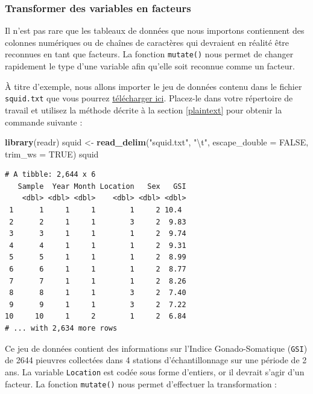 \documentclass[
  a4paper,
]{article}
\newenvironment{Shaded}{\begin{snugshade}}{\end{snugshade}}
\newcommand{\CharTok}[1]{\textcolor[rgb]{0.57,0.30,0.62}{#1}}
\newcommand{\DataTypeTok}[1]{\textcolor[rgb]{0.00,0.34,0.68}{#1}}
\newcommand{\KeywordTok}[1]{\textcolor[rgb]{0.12,0.11,0.11}{\textbf{#1}}}
\newcommand{\NormalTok}[1]{\textcolor[rgb]{0.12,0.11,0.11}{#1}}
\newcommand{\OtherTok}[1]{\textcolor[rgb]{0.00,0.43,0.16}{#1}}
\newcommand{\StringTok}[1]{\textcolor[rgb]{0.75,0.01,0.01}{#1}}
\begin{document}
\hypertarget{transformer-des-variables-en-facteurs}{%
\subsubsection{Transformer des variables en facteurs}\label{transformer-des-variables-en-facteurs}}

Il n'est pas rare que les tableaux de données que nous importons contiennent des colonnes numériques ou de chaînes de caractères qui devraient en réalité être reconnues en tant que facteurs. La fonction \texttt{mutate()} nous permet de changer rapidement le type d'une variable afin qu'elle soit reconnue comme un facteur.

À titre d'exemple, nous allons importer le jeu de données contenu dans le fichier \texttt{squid.txt} que vous pourrez \href{data/squid.txt}{télécharger ici}. Placez-le dans votre répertoire de travail et utilisez la méthode décrite à la section \ref{plaintext} pour obtenir la commande suivante :

\begin{Shaded}
\begin{Highlighting}[]
\KeywordTok{library}\NormalTok{(readr)}
\NormalTok{squid <-}\StringTok{ }\KeywordTok{read_delim}\NormalTok{(}\StringTok{"squid.txt"}\NormalTok{, }\StringTok{"}\CharTok{\textbackslash{}t}\StringTok{"}\NormalTok{, }\DataTypeTok{escape_double =} \OtherTok{FALSE}\NormalTok{, }\DataTypeTok{trim_ws =} \OtherTok{TRUE}\NormalTok{)}
\NormalTok{squid}
\end{Highlighting}
\end{Shaded}

\begin{verbatim}
# A tibble: 2,644 x 6
   Sample  Year Month Location   Sex   GSI
    <dbl> <dbl> <dbl>    <dbl> <dbl> <dbl>
 1      1     1     1        1     2 10.4 
 2      2     1     1        3     2  9.83
 3      3     1     1        1     2  9.74
 4      4     1     1        1     2  9.31
 5      5     1     1        1     2  8.99
 6      6     1     1        1     2  8.77
 7      7     1     1        1     2  8.26
 8      8     1     1        3     2  7.40
 9      9     1     1        3     2  7.22
10     10     1     2        1     2  6.84
# ... with 2,634 more rows
\end{verbatim}

Ce jeu de données contient des informations sur l'Indice Gonado-Somatique (\texttt{GSI}) de 2644 pieuvres collectées dans 4 stations d'échantillonnage sur une période de 2 ans. La variable \texttt{Location} est codée sous forme d'entiers, or il devrait s'agir d'un facteur. La fonction \texttt{mutate()} nous permet d'effectuer la transformation :
\end{document}
